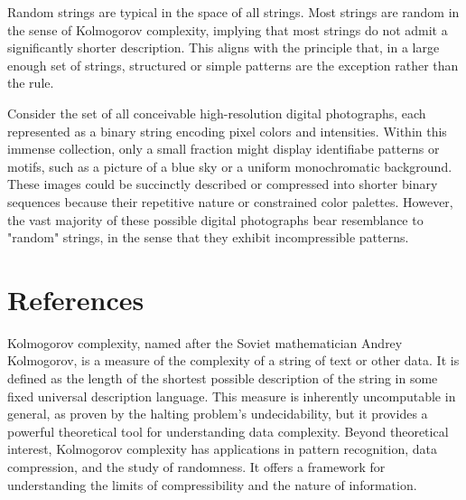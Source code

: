 Random strings are typical in the space of all strings. Most strings are random in the sense of Kolmogorov complexity, implying that most strings do not admit a significantly shorter description. This aligns with the principle that, in a large enough set of strings, structured or simple patterns are the exception rather than the rule.

\begin{example}
Consider the set of all conceivable high-resolution digital photographs, each represented as a binary string encoding pixel colors and intensities. Within this immense collection, only a small fraction might display identifiabe patterns or motifs, such as a picture of a blue sky or a uniform monochromatic background. These images could be succinctly described or compressed into shorter binary sequences because their repetitive nature or constrained color palettes. However, the vast majority of these possible digital photographs bear resemblance to "random" strings, in the sense that they exhibit incompressible patterns.
\end{example}

%
%

\section*{References}

Kolmogorov complexity, named after the Soviet mathematician Andrey Kolmogorov, is a measure of the complexity of a string of text or other data. It is defined as the length of the shortest possible description of the string in some fixed universal description language. This measure is inherently uncomputable in general, as proven by the halting problem's undecidability, but it provides a powerful theoretical tool for understanding data complexity. Beyond theoretical interest, Kolmogorov complexity has applications in pattern recognition, data compression, and the study of randomness. It offers a framework for understanding the limits of compressibility and the nature of information.

